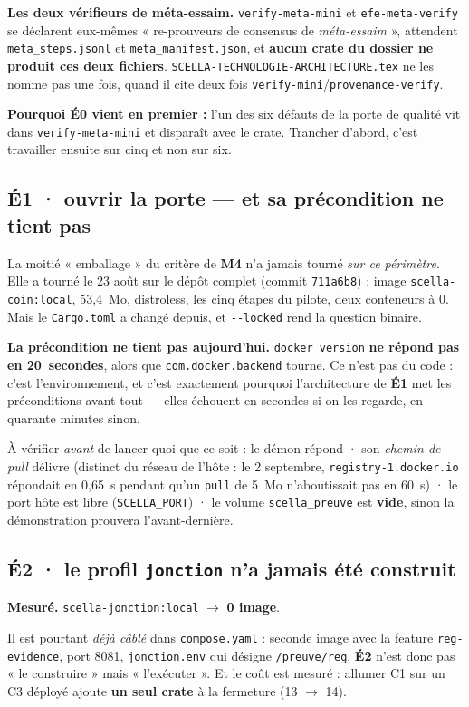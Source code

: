 \documentclass[11pt]{article}
\newcommand{\code}[1]{\texttt{\small #1}}
\newcommand{\best}[1]{{\color{efesolve}\textbf{#1}}}
\newcommand{\pire}[1]{{\color{efered}\textbf{#1}}}
\newcommand{\mm}[1]{\textbf{#1}}
\newcommand{\mesure}[1]{{\color{efeteal}\textbf{Mesuré.} }#1\par}
\newcommand{\fl}{$\rightarrow$}
\begin{document}
\textbf{Les deux vérifieurs de méta-essaim.} \code{verify-meta-mini} et \code{efe-meta-verify}
se déclarent eux-mêmes « re-prouveurs de consensus de \emph{méta-essaim} », attendent
\code{meta\_steps.jsonl} et \code{meta\_manifest.json}, et \best{aucun crate du dossier ne produit
ces deux fichiers}. \code{SCELLA-TECHNOLOGIE-ARCHITECTURE.tex} ne les nomme pas une fois, quand il
cite deux fois \code{verify-mini}/\code{provenance-verify}.

\textbf{Pourquoi \mm{É0} vient en premier :} l'un des six défauts de la porte de qualité vit
dans \code{verify-meta-mini} et disparaît avec le crate. Trancher d'abord, c'est travailler
ensuite sur cinq et non sur six.

\subsection{\mm{É1} · ouvrir la porte --- et sa précondition ne tient pas}
La moitié « emballage » du critère de \mm{M4} n'a jamais tourné \emph{sur ce périmètre}. Elle a
tourné le 23 août sur le dépôt complet (commit \code{711a6b8}) : image \code{scella-coin:local},
53,4~Mo, distroless, les cinq étapes du pilote, deux conteneurs à 0. Mais le \code{Cargo.toml} a
changé depuis, et \code{-{}-locked} rend la question binaire.

\begin{cadre}
\textbf{La précondition ne tient pas aujourd'hui.} \code{docker version} \pire{ne répond pas en
20~secondes}, alors que \code{com.docker.backend} tourne. Ce n'est pas du code : c'est
l'environnement, et c'est exactement pourquoi l'architecture de \mm{É1} met les préconditions
avant tout --- elles échouent en secondes si on les regarde, en quarante minutes sinon.

À vérifier \emph{avant} de lancer quoi que ce soit : le démon répond · son \emph{chemin de pull}
délivre (distinct du réseau de l'hôte : le 2 septembre, \code{registry-1.docker.io} répondait en
0,65~s pendant qu'un \code{pull} de 5~Mo n'aboutissait pas en 60~s) · le port hôte est libre
(\code{SCELLA\_PORT}) · le volume \code{scella\_preuve} est \textbf{vide}, sinon la démonstration
prouvera l'avant-dernière.
\end{cadre}

\subsection{\mm{É2} · le profil \code{jonction} n'a jamais été construit}
\mesure{\code{scella-jonction:local} \fl{} \pire{0 image}.} Il est pourtant \emph{déjà câblé} dans
\code{compose.yaml} : seconde image avec la feature \code{reg-evidence}, port 8081,
\code{jonction.env} qui désigne \code{/preuve/reg}. \mm{É2} n'est donc pas « le construire » mais
« l'exécuter ». Et le coût est mesuré : allumer C1 sur un C3 déployé ajoute \best{un seul crate}
à la fermeture (13 \fl{} 14).
\end{document}
